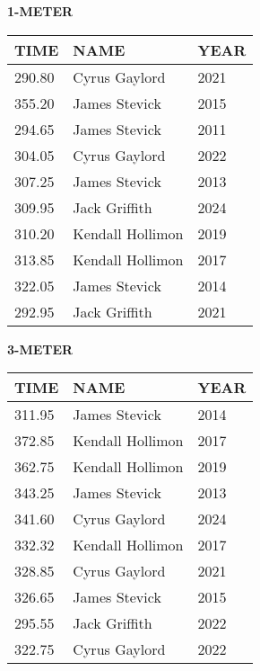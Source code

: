 \begin{center}
\begin{minipage}[t]{0.7\textwidth}
\centering
\textbf{1-METER}\\[0.05cm]
\begin{tabular}{@{}p{1.8cm}p{2.8cm}p{1.2cm}@{}}
\hline
\textbf{TIME} & \textbf{NAME} & \textbf{YEAR} \\
\hline
290.80 & Cyrus Gaylord & 2021 \\
355.20 & James Stevick & 2015 \\
294.65 & James Stevick & 2011 \\
304.05 & Cyrus Gaylord & 2022 \\
307.25 & James Stevick & 2013 \\
309.95 & Jack Griffith & 2024 \\
310.20 & Kendall Hollimon & 2019 \\
313.85 & Kendall Hollimon & 2017 \\
322.05 & James Stevick & 2014 \\
292.95 & Jack Griffith & 2021 \\
\hline
\end{tabular}
\end{minipage}
\end{center}

\vspace{0.4cm}

\begin{center}
\begin{minipage}[t]{0.7\textwidth}
\centering
\textbf{3-METER}\\[0.05cm]
\begin{tabular}{@{}p{1.8cm}p{2.8cm}p{1.2cm}@{}}
\hline
\textbf{TIME} & \textbf{NAME} & \textbf{YEAR} \\
\hline
311.95 & James Stevick & 2014 \\
372.85 & Kendall Hollimon & 2017 \\
362.75 & Kendall Hollimon & 2019 \\
343.25 & James Stevick & 2013 \\
341.60 & Cyrus Gaylord & 2024 \\
332.32 & Kendall Hollimon & 2017 \\
328.85 & Cyrus Gaylord & 2021 \\
326.65 & James Stevick & 2015 \\
295.55 & Jack Griffith & 2022 \\
322.75 & Cyrus Gaylord & 2022 \\
\hline
\end{tabular}
\end{minipage}
\end{center}

